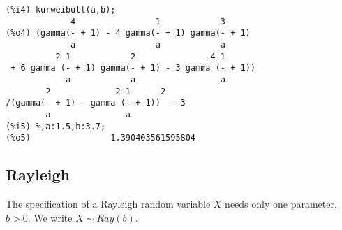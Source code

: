 \documentclass[12pt,a4paper]{article}
\begin{document}
\begin{description}
\begin{verbatim}
(%i4) kurweibull(a,b);
             4                1            3
(%o4) (gamma(- + 1) - 4 gamma(- + 1) gamma(- + 1)
             a                a            a
          2 1            2               4 1
 + 6 gamma (- + 1) gamma(- + 1) - 3 gamma (- + 1))
            a            a                 a
        2             2 1      2
/(gamma(- + 1) - gamma (- + 1))  - 3
        a               a
(%i5) %,a:1.5,b:3.7;
(%o5)                1.390403561595804
\end{verbatim}

\end{description}


\subsection{Rayleigh} 

The specification of a Rayleigh random variable $X$ needs only one parameter, $b>0$. We write $X \sim Ray(b)$.
\end{document}
